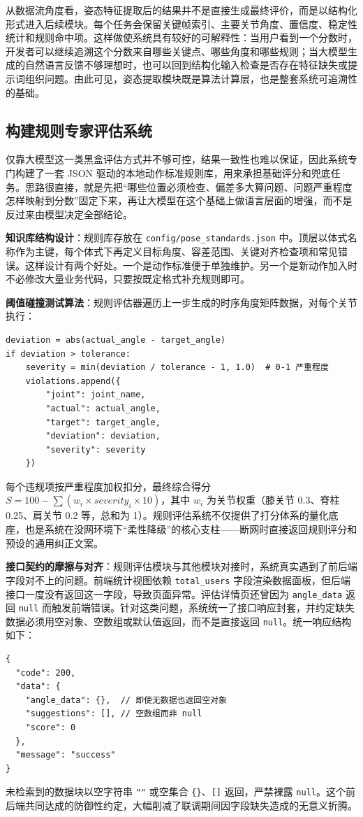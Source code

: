 \documentclass[UTF8,twoside]{ctexrep}
\makeatletter
\def@NAT@last@yr{\@citea}%
\def@NAT@last@yr{-\NAT@penalty}%
\makeatother
\begin{document}
从数据流角度看，姿态特征提取后的结果并不是直接生成最终评价，而是以结构化形式进入后续模块。每个任务会保留关键帧索引、主要关节角度、置信度、稳定性统计和规则命中项。这样做使系统具有较好的可解释性：当用户看到一个分数时，开发者可以继续追溯这个分数来自哪些关键点、哪些角度和哪些规则；当大模型生成的自然语言反馈不够理想时，也可以回到结构化输入检查是否存在特征缺失或提示词组织问题。由此可见，姿态提取模块既是算法计算层，也是整套系统可追溯性的基础。

\subsection{构建规则专家评估系统}
仅靠大模型这一类黑盒评估方式并不够可控，结果一致性也难以保证，因此系统专门构建了一套 JSON 驱动的本地动作标准规则库，用来承担基础评分和兜底任务。思路很直接，就是先把“哪些位置必须检查、偏差多大算问题、问题严重程度怎样映射到分数”固定下来，再让大模型在这个基础上做语言层面的增强，而不是反过来由模型决定全部结论。

\textbf{知识库结构设计}：规则库存放在 \texttt{config/pose\_standards.json} 中。顶层以体式名称作为主键，每个体式下再定义目标角度、容差范围、关键对齐检查项和常见错误。这样设计有两个好处。一个是动作标准便于单独维护。另一个是新动作加入时不必修改大量业务代码，只要按既定格式补充规则即可。

\textbf{阈值碰撞测试算法}：规则评估器遍历上一步生成的时序角度矩阵数据，对每个关节执行：
\begin{verbatim}
deviation = abs(actual_angle - target_angle)
if deviation > tolerance:
    severity = min(deviation / tolerance - 1, 1.0)  # 0-1 严重程度
    violations.append({
        "joint": joint_name,
        "actual": actual_angle,
        "target": target_angle,
        "deviation": deviation,
        "severity": severity
    })
\end{verbatim}
每个违规项按严重程度加权扣分，最终综合得分 $S = 100 - \sum (w_i \times severity_i \times 10)$，其中 $w_i$ 为关节权重（膝关节 0.3、脊柱 0.25、肩关节 0.2 等，总和为 1）。规则评估系统不仅提供了打分体系的量化底座，也是系统在没网环境下“柔性降级”的核心支柱——断网时直接返回规则评分和预设的通用纠正文案。

\textbf{接口契约的摩擦与对齐}：规则评估模块与其他模块对接时，系统真实遇到了前后端字段对不上的问题。前端统计视图依赖 \texttt{total\_users} 字段渲染数据面板，但后端接口一度没有返回这一字段，导致页面异常。评估详情页还曾因为 \texttt{angle\_data} 返回 \texttt{null} 而触发前端错误。针对这类问题，系统统一了接口响应封套，并约定缺失数据必须用空对象、空数组或默认值返回，而不是直接返回 \texttt{null}。统一响应结构如下：
\begin{verbatim}
{
  "code": 200,
  "data": {
    "angle_data": {},  // 即使无数据也返回空对象
    "suggestions": [], // 空数组而非 null
    "score": 0
  },
  "message": "success"
}
\end{verbatim}
未检索到的数据块以空字符串 \texttt{""} 或空集合 \texttt{\{\}}、\texttt{[]} 返回，严禁裸露 \texttt{null}。这个前后端共同达成的防御性约定，大幅削减了联调期间因字段缺失造成的无意义折腾。
\end{document}
